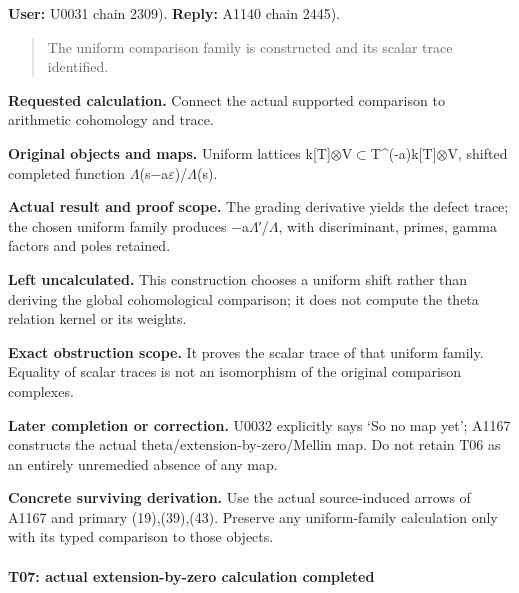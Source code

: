 \textbf{User:} U0031
\protect{} chain 2309).
\textbf{Reply:} A1140
\protect{} chain 2445).

\begin{quote}
The uniform comparison family is constructed and its scalar trace
identified.
\end{quote}

\textbf{Requested calculation.} Connect the actual supported comparison
to arithmetic cohomology and trace.

\textbf{Original objects and maps.} Uniform lattices
k[T]\allowbreak{}\ensuremath{⊗}\allowbreak{}V\allowbreak{}\ensuremath{⊂}\allowbreak{}T\textasciicircum{}(-a)k[T]\allowbreak{}\ensuremath{⊗}\allowbreak{}V,
shifted completed function
\allowbreak{}\ensuremath{Λ}\allowbreak{}(s\allowbreak{}\ensuremath{−}\allowbreak{}a\allowbreak{}\ensuremath{ε}\allowbreak{})/\allowbreak{}\ensuremath{Λ}\allowbreak{}(s).

\textbf{Actual result and proof scope.} The grading derivative yields
the defect trace; the chosen uniform family produces
\allowbreak{}\ensuremath{−}\allowbreak{}a\allowbreak{}\ensuremath{Λ}\allowbreak{}′/\allowbreak{}\ensuremath{Λ}\allowbreak{},
with discriminant, primes, gamma factors and poles retained.

\textbf{Left uncalculated.} This construction chooses a uniform shift
rather than deriving the global cohomological comparison; it does not
compute the theta relation kernel or its weights.

\textbf{Exact obstruction scope.} It proves the scalar trace of that
uniform family. Equality of scalar traces is not an isomorphism of the
original comparison complexes.

\textbf{Later completion or correction.} U0032 explicitly says `So no
map yet'; A1167 constructs the actual theta/extension-by-zero/Mellin
map. Do not retain T06 as an entirely unremedied absence of any map.

\textbf{Concrete surviving derivation.} Use the actual source-induced
arrows of A1167 and primary (19),(39),(43). Preserve any uniform-family
calculation only with its typed comparison to those objects.

\paragraph{T07: actual extension-by-zero calculation
completed}\label{t07-actual-extension-by-zero-calculation-completed}

